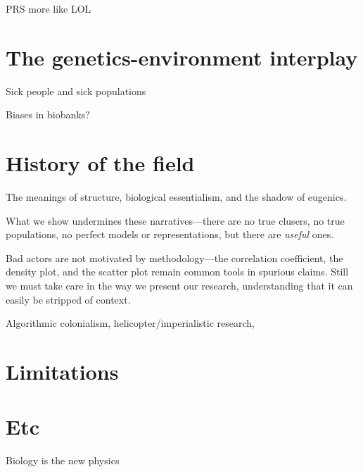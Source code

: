 PRS more like LOL\citep{kaplan_polygenic_2022}

\section{The genetics-environment interplay}

Sick people and sick populations\citep{rose_sick_2001}

Biases in biobanks?

\section{History of the field}

The meanings of structure, biological essentialism, and the shadow of eugenics.

What we show undermines these narratives---there are no true clusers, no true populations, no perfect models or representations, but there are \textit{useful} ones.

Bad actors are not motivated by methodology---the correlation coefficient, the density plot, and the scatter plot remain common tools in spurious claims. Still we must take care in the way we present our research, understanding that it can easily be stripped of context.

Algorithmic colonialism, helicopter/imperialistic research, 

\citep{gebru_race_2020}



\section{Limitations}

\section{Etc}

Biology is the new physics \citep{hunter_biology_2010}

